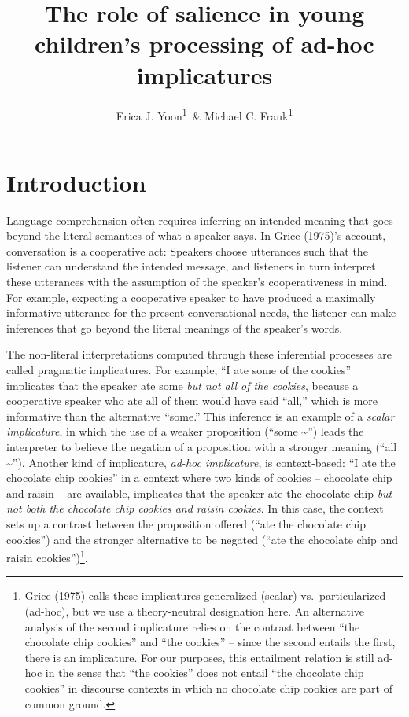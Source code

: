\documentclass[man]{apa6}
\title{The role of salience in young children's processing of ad-hoc
implicatures}
\author{Erica J. Yoon\textsuperscript{1}~\& Michael C. Frank\textsuperscript{1}}
\affiliation{
    \vspace{0.5cm}
          \textsuperscript{1} Stanford University  }
\theoremstyle{definition}
\theoremstyle{definition}
\theoremstyle{definition}
\theoremstyle{remark}
\begin{document}
\maketitle

\setcounter{secnumdepth}{0}



\section{Introduction}\label{introduction}

Language comprehension often requires inferring an intended meaning that
goes beyond the literal semantics of what a speaker says. In Grice
(1975)'s account, conversation is a cooperative act: Speakers choose
utterances such that the listener can understand the intended message,
and listeners in turn interpret these utterances with the assumption of
the speaker's cooperativeness in mind. For example, expecting a
cooperative speaker to have produced a maximally informative utterance
for the present conversational needs, the listener can make inferences
that go beyond the literal meanings of the speaker's words.

The non-literal interpretations computed through these inferential
processes are called pragmatic implicatures. For example, \enquote{I ate
some of the cookies} implicates that the speaker ate some \emph{but not
all of the cookies}, because a cooperative speaker who ate all of them
would have said \enquote{all,} which is more informative than the
alternative \enquote{some.} This inference is an example of a
\emph{scalar implicature}, in which the use of a weaker proposition
(\enquote{some \textasciitilde{}}) leads the interpreter to believe the
negation of a proposition with a stronger meaning (\enquote{all
\textasciitilde{}}). Another kind of implicature, \emph{ad-hoc
implicature}, is context-based: \enquote{I ate the chocolate chip
cookies} in a context where two kinds of cookies -- chocolate chip and
raisin -- are available, implicates that the speaker ate the chocolate
chip \emph{but not both the chocolate chip cookies and raisin cookies}.
In this case, the context sets up a contrast between the proposition
offered (\enquote{ate the chocolate chip cookies}) and the stronger
alternative to be negated (\enquote{ate the chocolate chip and raisin
cookies})\footnote{Grice (1975) calls these implicatures generalized
  (scalar) vs.~particularized (ad-hoc), but we use a theory-neutral
  designation here. An alternative analysis of the second implicature
  relies on the contrast between \enquote{the chocolate chip cookies}
  and \enquote{the cookies} -- since the second entails the first, there
  is an implicature. For our purposes, this entailment relation is still
  ad-hoc in the sense that \enquote{the cookies} does not entail
  \enquote{the chocolate chip cookies} in discourse contexts in which no
  chocolate chip cookies are part of common ground.}.
\end{document}
